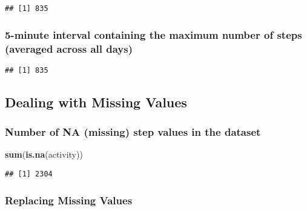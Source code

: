 \documentclass[
]{article}
\newenvironment{Shaded}{\begin{snugshade}}{\end{snugshade}}
\newcommand{\KeywordTok}[1]{\textcolor[rgb]{0.13,0.29,0.53}{\textbf{#1}}}
\newcommand{\NormalTok}[1]{#1}
\newcommand{\OperatorTok}[1]{\textcolor[rgb]{0.81,0.36,0.00}{\textbf{#1}}}
\begin{document}
\begin{verbatim}
## [1] 835
\end{verbatim}

\hypertarget{minute-interval-containing-the-maximum-number-of-steps-averaged-across-all-days}{%
\subsubsection{5-minute interval containing the maximum number of steps
(averaged across all
days)}\label{minute-interval-containing-the-maximum-number-of-steps-averaged-across-all-days}}

\begin{Shaded}
\end{Shaded}

\begin{verbatim}
## [1] 835
\end{verbatim}

\hypertarget{dealing-with-missing-values}{%
\subsection{Dealing with Missing
Values}\label{dealing-with-missing-values}}

\hypertarget{number-of-na-missing-step-values-in-the-dataset}{%
\subsubsection{Number of NA (missing) step values in the
dataset}\label{number-of-na-missing-step-values-in-the-dataset}}

\begin{Shaded}
\begin{Highlighting}[]
\KeywordTok{sum}\NormalTok{(}\KeywordTok{is.na}\NormalTok{(activity))}
\end{Highlighting}
\end{Shaded}

\begin{verbatim}
## [1] 2304
\end{verbatim}

\hypertarget{replacing-missing-values}{%
\subsubsection{Replacing Missing
Values}\label{replacing-missing-values}}
\end{document}

